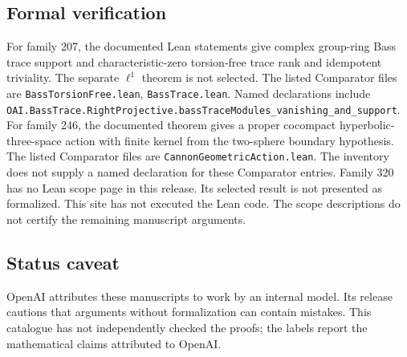 \documentclass[11pt]{article}
\begin{document}
\subsection{Formal verification}
For family 207, the documented Lean statements give complex group-ring Bass trace support and characteristic-zero torsion-free trace rank and idempotent triviality. The separate $\ell^1$ theorem is not selected. The listed Comparator files are \texttt{BassTorsionFree.lean}, \texttt{BassTrace.lean}. Named declarations include \texttt{OAI.BassTrace.RightProjective.bassTraceModules\_vanishing\_and\_support}. For family 246, the documented theorem gives a proper cocompact hyperbolic-three-space action with finite kernel from the two-sphere boundary hypothesis. The listed Comparator files are \texttt{CannonGeometricAction.lean}. The inventory does not supply a named declaration for these Comparator entries. Family 320 has no Lean scope page in this release. Its selected result is not presented as formalized. This site has not executed the Lean code. The scope descriptions do not certify the remaining manuscript arguments.

\subsection{Status caveat}
OpenAI attributes these manuscripts to work by an internal model. Its release cautions that arguments without formalization can contain mistakes. This catalogue has not independently checked the proofs; the labels report the mathematical claims attributed to OpenAI.
\end{document}
